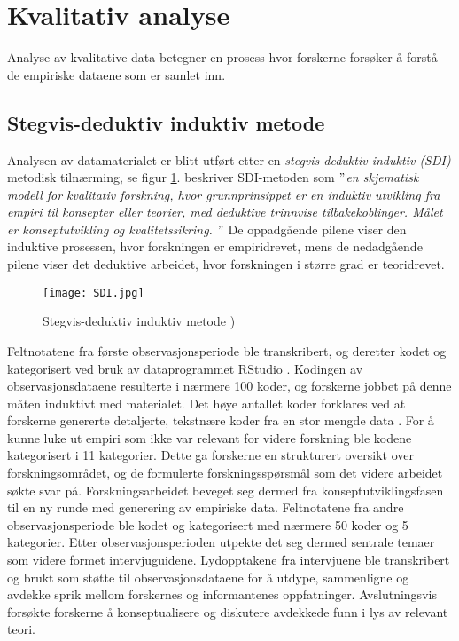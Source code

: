 \section{Kvalitativ analyse}
\label{section:kvalitativ_analyse} 

Analyse av kvalitative data betegner en prosess hvor forskerne forsøker å forstå de empiriske dataene som er samlet inn. 

\subsection{Stegvis-deduktiv induktiv metode}
Analysen av datamaterialet er blitt utført etter en \textit{stegvis-deduktiv induktiv (SDI)} metodisk tilnærming, se figur \ref{SDI}. \citet{Tjora} beskriver SDI-metoden som \textit{$"$en skjematisk modell for kvalitativ forskning, hvor grunnprinsippet er en induktiv utvikling fra empiri til konsepter eller teorier, med deduktive trinnvise tilbakekoblinger. Målet er konseptutvikling og kvalitetssikring. $"$} De oppadgående pilene viser den induktive prosessen, hvor forskningen er empiridrevet, mens de nedadgående pilene viser det deduktive arbeidet, hvor forskningen i større grad er teoridrevet.

\begin{figure}[H]
\centering
\texttt{[image: SDI.jpg]}
\caption{Stegvis-deduktiv induktiv metode \citep{Tjora})}
\label{SDI}
\end{figure}

\noindent
Feltnotatene fra første observasjonsperiode ble transkribert, og deretter kodet og kategorisert ved bruk av dataprogrammet RStudio \citep{Rstudio}. Kodingen av observasjonsdataene resulterte i nærmere 100 koder, og forskerne jobbet på denne måten induktivt med materialet. Det høye antallet koder forklares ved at forskerne genererte detaljerte, tekstnære koder fra en stor mengde data \citep{Tjora}. For å kunne luke ut empiri som ikke var relevant for videre forskning ble kodene kategorisert i 11 kategorier. Dette ga forskerne en strukturert oversikt over forskningsområdet, og de formulerte forskningsspørsmål som det videre arbeidet søkte svar på. Forskningsarbeidet beveget seg dermed fra konseptutviklingsfasen til en ny runde med generering av empiriske data. Feltnotatene fra andre observasjonsperiode ble kodet og kategorisert med nærmere 50 koder og 5 kategorier. Etter observasjonsperioden utpekte det seg dermed sentrale temaer som videre formet intervjuguidene. Lydopptakene fra intervjuene ble transkribert og brukt som støtte til observasjonsdataene for å utdype, sammenligne og avdekke sprik mellom forskernes og informantenes oppfatninger. Avslutningsvis forsøkte forskerne å konseptualisere og diskutere avdekkede funn i lys av relevant teori. 

